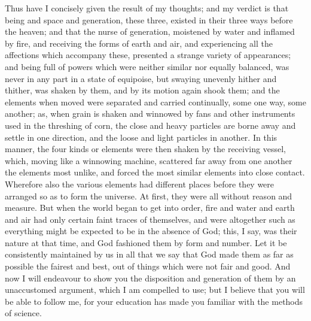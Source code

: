\documentclass[11pt,letter]{article}
\begin{document}
\par  Thus have I concisely given the result of my thoughts; and my verdict is that being and space and generation, these three, existed in their three ways before the heaven; and that the nurse of generation, moistened by water and inflamed by fire, and receiving the forms of earth and air, and experiencing all the affections which accompany these, presented a strange variety of appearances; and being full of powers which were neither similar nor equally balanced, was never in any part in a state of equipoise, but swaying unevenly hither and thither, was shaken by them, and by its motion again shook them; and the elements when moved were separated and carried continually, some one way, some another; as, when grain is shaken and winnowed by fans and other instruments used in the threshing of corn, the close and heavy particles are borne away and settle in one direction, and the loose and light particles in another. In this manner, the four kinds or elements were then shaken by the receiving vessel, which, moving like a winnowing machine, scattered far away from one another the elements most unlike, and forced the most similar elements into close contact. Wherefore also the various elements had different places before they were arranged so as to form the universe. At first, they were all without reason and measure. But when the world began to get into order, fire and water and earth and air had only certain faint traces of themselves, and were altogether such as everything might be expected to be in the absence of God; this, I say, was their nature at that time, and God fashioned them by form and number. Let it be consistently maintained by us in all that we say that God made them as far as possible the fairest and best, out of things which were not fair and good. And now I will endeavour to show you the disposition and generation of them by an unaccustomed argument, which I am compelled to use; but I believe that you will be able to follow me, for your education has made you familiar with the methods of science.
\end{document}
